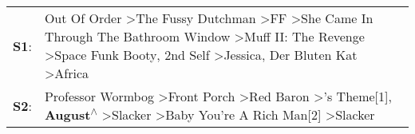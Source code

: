 \begin{supertabular}{p{0.03\textwidth}p{0.92\textwidth}}
 \textbf{S1}:  &  Out Of Order\textsuperscript{} \textgreater \enspace The Fussy Dutchman\textsuperscript{} \textgreater \enspace FF\textsuperscript{} \textgreater \enspace She Came In Through The Bathroom Window\textsuperscript{} \textgreater \enspace Muff II: The Revenge\textsuperscript{} \textgreater \enspace Space Funk Booty\textsuperscript{}, \enspace 2nd Self\textsuperscript{} \textgreater \enspace Jessica\textsuperscript{}, \enspace Der Bluten Kat\textsuperscript{} \textgreater \enspace Africa\textsuperscript{}  \enspace  \\
 \textbf{S2}:  &                                                                                                      Professor Wormbog\textsuperscript{} \textgreater \enspace Front Porch\textsuperscript{} \textgreater \enspace Red Baron\textsuperscript{} \textgreater {}'s Theme[1]\textsuperscript{}, \enspace \textbf{August\textsuperscript{$\wedge$}} \textgreater \enspace Slacker\textsuperscript{} \textgreater \enspace Baby You're A Rich Man[2]\textsuperscript{} \textgreater \enspace Slacker\textsuperscript{}  \enspace  \\
\end{supertabular}
